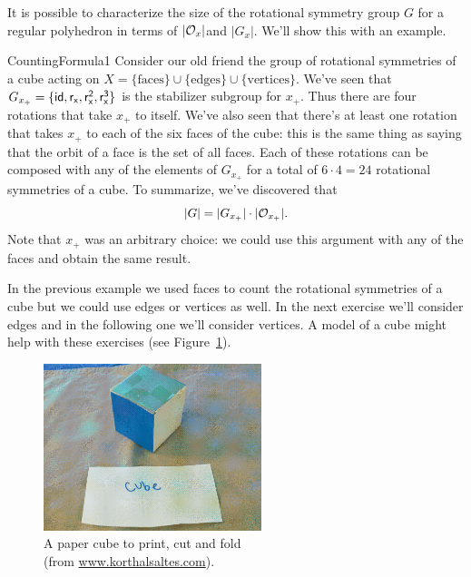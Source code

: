 It is possible to characterize the size of the rotational symmetry group $G$ for a regular polyhedron in terms of $|{\cal O}_x|$and $|G_x|$. We'll show this with an example.

\begin{example}{CountingFormula1} 
Consider our old friend the group of rotational symmetries of a cube acting on $X=\{\text{faces}\}\cup\{\text{edges}\}\cup\{\text{vertices}\}$. We've seen that $G_{x_+}=\{\sf{id},r_x,r_x^2,r_x^3\}$ is the stabilizer subgroup for $x_+$.  Thus there are four rotations that take $x_+$ to itself.  We've also seen that there's at least one rotation that takes $x_+$ to each of the six faces of the cube:  this is the same thing as saying that the orbit of a face is the set of all faces.  Each of these rotations can be composed with any of the elements of $G_{x_+}$ for a total of $6\cdot 4=24$ rotational symmetries of a cube.  To summarize, we've discovered that 
$$|G|=|G_{x_+}|\cdot |{\cal O}_{x_+}|.$$
Note that $x_+$ was an arbitrary choice: we could use this argument with any of the faces and obtain the same result.
\end{example}

In the previous example we used faces to count the rotational symmetries of a cube but we could use edges or vertices as well.  In the next exercise we'll consider edges and in the following one we'll consider vertices.   A model of a cube might help with these exercises (see Figure~\ref{fig:CubeFold}).

\begin{figure}[ht]
\begin{center}
\includegraphics[width=2.5in]{images/CubeFold.png}
\caption[caption]{A paper cube to print, cut and fold 
\\ \hspace{\textwidth} 
(from \url{www.korthalsaltes.com}).}
 \label{fig:CubeFold}
\end{center}
\end{figure}

